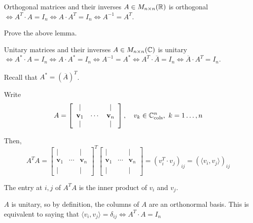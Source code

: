 \documentclass[12pt]{article}
\begin{document}
\begin{lemma}{Orthogonal matrices and their inverses}{}
    $A \in M_{n \times n}(\mathbb{R})$ is orthogonal $\iff A^T \cdot A = I_n \iff A \cdot A^T = I_n \iff A^{-1} = A^T$.
\end{lemma}

\begin{exercise}{}{}
    Prove the above lemma.
\end{exercise}

\begin{lemma}{Unitary matrices and their inverses}{}
    $A \in M_{n \times n}(\mathbb{C})$ is unitary $\iff A^* \cdot A = I_n \iff A \cdot A^* = I_n \iff A^{-1} = A^* \iff A^T \cdot \overline{A} = I_n \iff \overline{A} \cdot A^T = I_n$.

    Recall that $A^* = (\overline{A})^T$.
\end{lemma}

\begin{proofbox}
    Write
    $$
        A = \left[
                \begin{array}{cccc}
                | &  & | \\
                \mathbf{v}_1& \cdots & \mathbf{v}_n \\
                | &  & |
                \end{array}
            \right],\quad v_k \in \C_\text{cols}^n,\ k=1\dots,n
    $$

    Then, 
    $$
        A^T A = \left[
                \begin{array}{cccc}
                | &  & | \\
                \mathbf{v}_1& \cdots & \mathbf{v}_n \\
                | &  & |
                \end{array}
            \right]^T 
             \left[
                \begin{array}{cccc}
                | &  & | \\
                \mathbf{v}_1& \cdots & \mathbf{v}_n \\
                | &  & |
                \end{array}
            \right] = (v_i^T \cdot v_j)_{ij} = (\langle v_i, v_j \rangle)_{ij}
    $$

    The entry at $i, j$ of $A^T A$ is the inner product of $v_i$ and $v_j$.

    $A$ is unitary, so by definition, the columns of $A$ are an orthonormal basis. This is equivalent to saying that $\langle v_i, v_j \rangle = \delta_{ij} \iff A^T \cdot A = I_n$
\end{proofbox}
\end{document}
